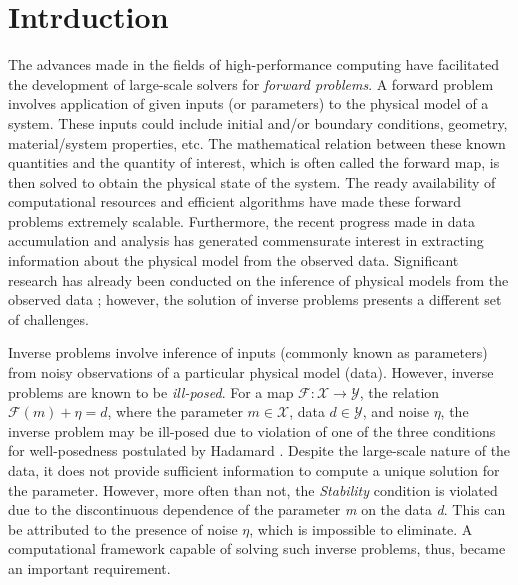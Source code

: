 \chapter{Intrduction}
\label{chapter:introduction}

The advances made in the fields of high-performance computing have facilitated the development of large-scale solvers for \textit{forward problems}. A forward problem involves application of given inputs (or parameters) to the physical model of a system. These inputs could include initial and/or boundary conditions, geometry, material/system properties, etc. The mathematical relation between these known quantities and the quantity of interest, which is often called the forward map, is then solved to obtain the physical state of the system. The ready availability of computational resources and efficient algorithms have made these forward problems extremely scalable. Furthermore, the recent progress made in data accumulation and analysis has generated commensurate interest in extracting information about the physical model from the observed data. Significant research has already been conducted on the inference of physical models from the observed data \cite{banks2012estimation, sullivan2015introduction}; however, the solution of inverse problems presents a different set of challenges.

Inverse problems involve inference of inputs (commonly known as parameters) from noisy observations of a particular physical model (data). However, inverse problems are known to be \textit{ill-posed}. For a map $\mathcal{F} : \mathcal{X} \rightarrow \mathcal{Y}$, the relation $\mathcal{F}(m) + \eta = d$, where the parameter $m \in \mathcal{X}$, data $d \in \mathcal{Y}$, and noise $\eta$, the inverse problem may be ill-posed due to violation of one of the three conditions for well-posedness postulated by Hadamard \cite{hadamard1923lectures}. Despite the large-scale nature of the data, it does not provide sufficient information to compute a unique solution for the parameter. However, more often than not, the \textit{Stability} condition is violated due to the discontinuous dependence of the parameter \textit{m} on the data \textit{d}. This can be attributed to the presence of noise $\eta$, which is impossible to eliminate. A computational framework capable of solving such inverse problems, thus, became an important requirement.


